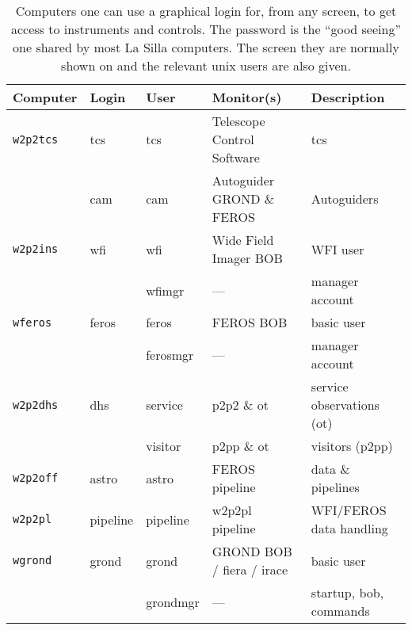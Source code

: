 \documentclass[11pt,fleqn]{book}
\begin{document}
\begin{table}
    \caption[Main workstations and users]{Computers one can use a graphical login for, from any screen, to get access to instruments and controls.  The password is the ``good seeing'' one shared by most  La Silla computers. The screen they are normally shown on and the relevant unix users are also given.  }
\label{fig:computers}
\centering
\begin{tabular}{lllll}
\hline
Computer         & Login    & User     & Monitor(s)                 & Description\\\hline\hline
\texttt{w2p2tcs} & tcs      & tcs      & Telescope Control Software & \gls{tcs}\\
                 & cam      & cam      & Autoguider GROND \& FEROS  & Autoguiders\\
\texttt{w2p2ins} & wfi      & wfi      & Wide Field Imager BOB      & WFI user\\
                 &          & wfimgr   & ---                        & manager account\\
\texttt{wferos}  & feros    & feros    & FEROS BOB                  & basic user\\
                 &          & ferosmgr & ---                        & manager account\\
\texttt{w2p2dhs} & dhs      & service  & p2p2 \& ot                 & service observations (ot)\\
                 &          & visitor  & p2pp \& ot                 & visitors (p2pp)\\
\texttt{w2p2off} & astro    & astro    & FEROS pipeline             & data \& pipelines\\
\texttt{w2p2pl}  & pipeline & pipeline & w2p2pl pipeline            & WFI/FEROS data handling\\       
\texttt{wgrond}  & grond    & grond    & GROND BOB / \gls{fiera} / \gls{irace}  & basic user\\
                 &          & grondmgr & ---                        & startup, \gls{bob}, commands\\
\hline
\end{tabular}
\end{table}
\end{document}
